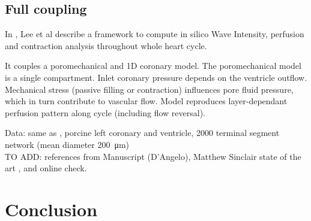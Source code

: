 \documentclass[a4paper, 11pt]{article} %
\begin{document}
\subsection*{Full coupling}

In \cite{lee2015multiscale}, Lee et al describe a framework to compute in silico Wave Intensity, perfusion and contraction analysis throughout whole heart cycle. 

It couples a poromechanical and 1D coronary model. 
The poromechanical model is a single compartment.
Inlet coronary pressure depends on the ventricle outflow. Mechanical stress (passive filling or contraction) influences pore fluid pressure, which in turn contribute to vascular flow.
Model reproduces layer-dependant perfusion pattern along cycle (including flow reversal).   

Data: same as \cite{michler2013computationally}, porcine left coronary and ventricle, 2000 terminal segment network (mean diameter \SI{200}{\micro\meter})\\


TO ADD: references from Manuscript (D'Angelo), Matthew Sinclair state of the art , and online check.

\section*{Conclusion}








\end{document}
